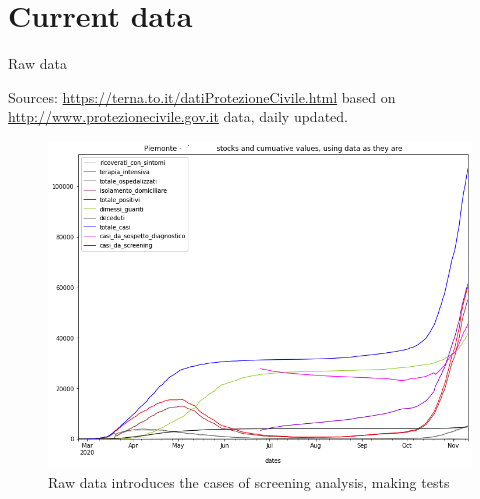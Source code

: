 \documentclass[8pt]{beamer}
\begin{document}
\section{Current data}

\begin{frame}{Raw data}

Sources: \url{https://terna.to.it/datiProtezioneCivile.html}  based on \url{http://www.protezionecivile.gov.it} data, daily updated.

\begin{figure}[H]
\center
\includegraphics[scale=0.26]{rawCurrent.png}

\caption{Raw data introduces the cases of screening analysis, making tests} 
\label{rawCurrent}
\end{figure}

\end{frame}
\end{document}
